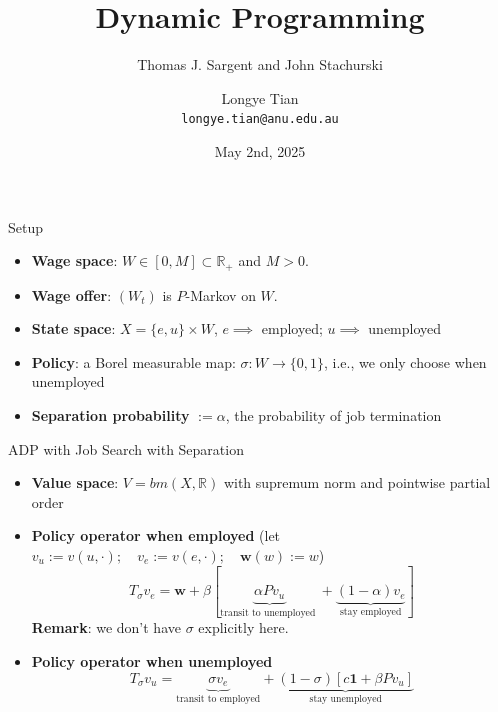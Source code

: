 \documentclass[aspectratio=169]{beamer} %
\title[DP2]{Dynamic Programming}
\subtitle{Thomas J. Sargent and John Stachurski}
\author[Longye]{Longye Tian \\ \texttt{longye.tian@anu.edu.au}}
\institute[ANU]{Australian National University\\ School of Economics}
\date{May 2nd, 2025}
\begin{document}
\begin{frame}
  \titlepage
\end{frame}


\begin{frame}{Setup}
\begin{itemize}
    \item \textbf{Wage space}: $W\in [0,M]\subset \mathbb{R}_+$ and $M>0$.
    \item \textbf{Wage offer}: $(W_t)$ is $P$-Markov on $W$.
    \item \textbf{State space}: $X = \{e,u\}\times W$, $e\implies$ employed; $u\implies$ unemployed
    \item \textbf{Policy}: a Borel measurable map: $\sigma: W\to \{0,1\}$, i.e., we only choose when unemployed
    \item \textbf{Separation probability} $:= \alpha $, the probability of job termination
\end{itemize}
    
\end{frame}


\begin{frame}{ADP with Job Search with Separation}
    \begin{itemize}
        \item \textbf{Value space}: $V = bm(X, \mathbb{R})$ with supremum norm and pointwise partial order
        \item \textbf{Policy operator when employed} (let $v_u:= v(u,\cdot); \quad v_e:=v(e,\cdot);\quad \mathbf{w}(w):= w$)
        $$
        T_\sigma v_e= \mathbf{w}+\beta\left[\underbrace{\alpha Pv_u}_{\text{transit to unemployed }} + \underbrace{(1-\alpha) v_e}_{\text{stay employed}}\right]
        $$
        \textbf{Remark}: we don't have $\sigma$ explicitly here.
        \item \textbf{Policy operator when unemployed}
        $$
        T_\sigma v_u = \underbrace{\sigma v_e}_{\text{transit to employed}} + \underbrace{(1-\sigma)\left[c\mathbf{1}+\beta Pv_u\right]}_{\text{stay unemployed}}
        $$
    \end{itemize}
\end{frame}
\end{document}
